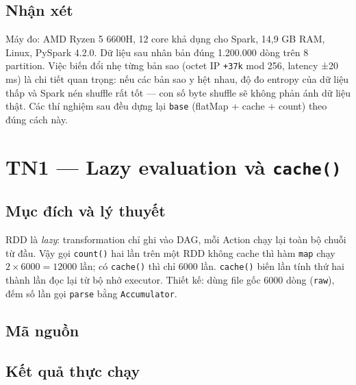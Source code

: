 \documentclass[12pt,a4paper,oneside]{article}
\begin{document}
\subsection{Nhận xét}

Máy đo: AMD Ryzen 5 6600H, 12 core khả dụng cho Spark, 14,9 GB RAM, Linux, PySpark 4.2.0. Dữ liệu sau nhân bản đúng 1.200.000 dòng trên 8 partition. Việc biến đổi nhẹ từng bản sao (octet IP \texttt{+37k} mod 256, latency ±20 ms) là chi tiết quan trọng: nếu các bản sao y hệt nhau, độ đo entropy của dữ liệu thấp và Spark nén shuffle rất tốt --- con số byte shuffle sẽ không phản ánh dữ liệu thật. Các thí nghiệm sau đều dựng lại \texttt{base} (flatMap + cache + count) theo đúng cách này.

\section{TN1 --- Lazy evaluation và \texttt{cache()}}
\label{sec:tn1}

\subsection{Mục đích và lý thuyết}

RDD là \emph{lazy}: transformation chỉ ghi vào DAG, mỗi Action chạy lại toàn bộ chuỗi từ đầu. Vậy gọi \texttt{count()} hai lần trên một RDD không cache thì hàm \texttt{map} chạy $2 \times 6000 = 12000$ lần; có \texttt{cache()} thì chỉ 6000 lần. \texttt{cache()} biến lần tính thứ hai thành lần đọc lại từ bộ nhớ executor. Thiết kế: dùng file gốc 6000 dòng (\texttt{raw}), đếm số lần gọi \texttt{parse} bằng \texttt{Accumulator}.

\subsection{Mã nguồn}



\subsection{Kết quả thực chạy}


\end{document}
